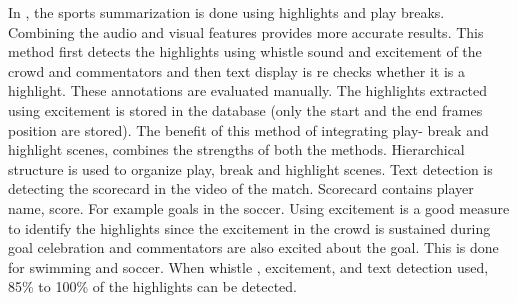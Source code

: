 In \cite{Tjondronegoro:2003:SVS:973264.973296}, the sports summarization is done using highlights and play breaks. Combining the audio and visual features provides more accurate results. This method first detects the highlights using  whistle sound and excitement of the crowd and commentators and then text display is re checks whether it is a highlight. These annotations are evaluated manually. The highlights extracted using excitement is stored in the database (only the start and the end frames position are stored). The benefit of this method of integrating play- break and highlight scenes, combines the strengths of both the methods. Hierarchical structure is used to organize play, break and highlight scenes. Text detection is detecting the scorecard in the video of the match. Scorecard contains player name, score. For example goals in the soccer. Using excitement is a good measure to identify the highlights since the excitement in the crowd is sustained during goal celebration and commentators are also excited about the goal.  This is done for swimming and soccer. When whistle , excitement, and text detection used, 85\% to 100\% of the highlights can be detected. 
	\cite{8491305}
	
\begin{comment}	
\section{Acronymns}
\lipsum[1]
\begin{itemize}
  \item The first item \acs{GSM}
  \item The second item \acs{GSM}
  \item The third\ldots \acs{GSM}
\end{itemize}
\subsection{Nested Enumerate}
\lipsum[1-2]
\begin{enumerate}
  \item The first item
  \begin{enumerate}
    \item Nested item 1
    \item Nested item 2
  \end{enumerate}
  \item The second item
  \item The third etc \ldots
\end{enumerate}
\lipsum[2]
\section{Itemize}

\begin{description}
  \item[First] The first item
  \item[Second] The second item
  \item[Third] The third\ldots
\end{description}
\lipsum[2-3]
\end{comment}